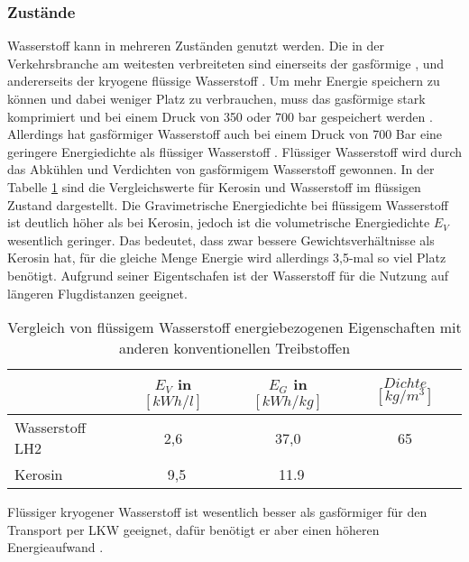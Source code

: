 \subsubsection{Zustände}
Wasserstoff kann in mehreren Zuständen genutzt werden. Die in der Verkehrsbranche am weitesten verbreiteten
sind einerseits der gasförmige , und andererseits der kryogene flüssige Wasserstoff . 
Um mehr Energie speichern zu können und dabei weniger Platz zu verbrauchen, muss das gasförmige  stark komprimiert und 
bei einem Druck von 350 oder 700 bar gespeichert werden \cite{colpan2022fuel}.
Allerdings hat gasförmiger Wasserstoff auch bei einem Druck von 700 Bar eine geringere Energiedichte
als flüssiger Wasserstoff \cite{eichlseder2012hydrogen}.
Flüssiger Wasserstoff wird durch das Abkühlen und Verdichten von gasförmigem Wasserstoff gewonnen.
In der Tabelle \ref{wasserstoff_energie} sind die Vergleichswerte für Kerosin und Wasserstoff im flüssigen Zustand dargestellt.
Die Gravimetrische Energiedichte bei flüssigem Wasserstoff ist deutlich höher als bei Kerosin, 
jedoch ist die volumetrische Energiedichte $E_V$ wesentlich geringer.
Das bedeutet, dass  zwar bessere Gewichtsverhältnisse als Kerosin hat, 
für die gleiche Menge Energie wird allerdings 3,5-mal so viel Platz benötigt.
Aufgrund seiner Eigentschafen ist der Wasserstoff für die Nutzung auf längeren Flugdistanzen geeignet.
\begin{table}[h]
	\begin{center}
    \caption{Vergleich von flüssigem Wasserstoff energiebezogenen Eigenschaften mit anderen konventionellen Treibstoffen}
	\label{wasserstoff_energie}
	\begin{tabular}{|l|c|c|c|}
		\hline
		& \textbf{$E_V$ in $[kWh/l]$} & \textbf{$E_G$ in $[kWh/kg]$} & \textbf{$Dichte$ $[kg/m^3]$}  \\ \hline
		Wasserstoff LH2 \cite{colpan2022fuel} & 2,6 & 37,0 & 65 \\ \hline
		Kerosin \cite{colpan2022fuel} & ~9,5 & ~11.9 &  \\ \hline %
	\end{tabular}
    \end{center}
\end{table}
%
Flüssiger kryogener Wasserstoff ist wesentlich besser als gasförmiger für den Transport per LKW geeignet,
dafür benötigt er aber einen höheren Energieaufwand \cite{colpan2022fuel}. 

